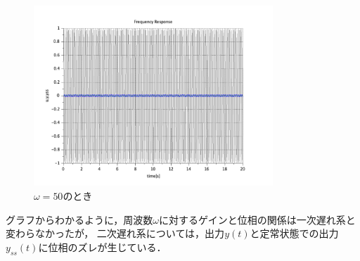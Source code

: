 \documentclass[a4paper,11pt]{jsarticle}
\begin{document}
\begin{figure}[H]
  \centering
  \includegraphics[width=9cm]{picture/3-1-2-50.png}
  \caption{$\omega = 50$のとき}
  \label{3-1-2-50}
\end{figure}
グラフからわかるように，周波数$\omega$に対するゲインと位相の関係は一次遅れ系と変わらなかったが，
二次遅れ系については，出力$y(t)$と定常状態での出力$y_{ss}(t)$に位相のズレが生じている．
\end{document}
